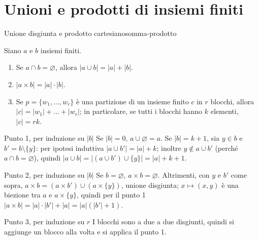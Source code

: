 \section{Unioni e prodotti di insiemi finiti}\label{sec:unioni-finite}

\begin{concetto}
\begin{Lemma}{Unione disgiunta e prodotto cartesiano}{somma-prodotto}
    \begin{prerequisiti}
    \end{prerequisiti}
    Siano $a$ e $b$ insiemi finiti.
    \begin{enumerate}
        \item Se $a \cap b = \varnothing$, allora $|a \cup b| = |a| + |b|$.
        \item $|a \times b| = |a| \cdot |b|$.
        \item Se $p = \{w_1, \dots, w_r\}$ è una partizione di un insieme finito $c$ in $r$ blocchi, allora $|c| = |w_1| + \dots + |w_r|$; in particolare,
              se tutti i blocchi hanno $k$ elementi, $|c| = rk$.
    \end{enumerate}
\end{Lemma}
\begin{dimostrazione}
    \begin{caso}{Punto 1, per induzione su $|b|$}
        Se $|b| = 0$, $a \cup \varnothing = a$. Se $|b| = k + 1$, sia $y \in b$ e $b' = b \setminus \{y\}$: per ipotesi induttiva $|a \cup b'| = |a| + k$;
        inoltre $y \notin a \cup b'$ (perché $a \cap b = \varnothing$), quindi $|a \cup b| = |(a \cup b') \cup \{y\}| = |a| + k + 1$.
    \end{caso}
    \begin{caso}{Punto 2, per induzione su $|b|$}
        Se $b = \varnothing$, $a \times b = \varnothing$. Altrimenti, con $y$ e $b'$ come sopra, $a \times b = (a \times b') \cup (a \times \{y\})$, unione
        disgiunta; $x \mapsto (x, y)$ è una biezione tra $a$ e $a \times \{y\}$, quindi per il punto 1 $|a \times b| = |a| \cdot |b'| + |a| = |a|(|b'| + 1)$.
    \end{caso}
    \begin{caso}{Punto 3, per induzione su $r$}
        I blocchi sono a due a due disgiunti, quindi si aggiunge un blocco alla volta e si applica il punto 1.
    \end{caso}
\end{dimostrazione}
\end{concetto}

